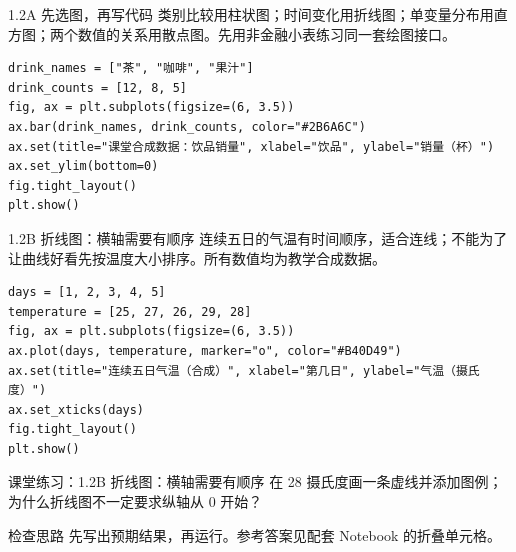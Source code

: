 \begin{frame}[fragile]{1.2A 先选图，再写代码}
\small 类别比较用柱状图；时间变化用折线图；单变量分布用直方图；两个数值的关系用散点图。先用非金融小表练习同一套绘图接口。
\medskip
\begin{lstlisting}
drink_names = ["茶", "咖啡", "果汁"]
drink_counts = [12, 8, 5]
fig, ax = plt.subplots(figsize=(6, 3.5))
ax.bar(drink_names, drink_counts, color="#2B6A6C")
ax.set(title="课堂合成数据：饮品销量", xlabel="饮品", ylabel="销量（杯）")
ax.set_ylim(bottom=0)
fig.tight_layout()
plt.show()
\end{lstlisting}
\end{frame}

\begin{frame}[fragile]{1.2B 折线图：横轴需要有顺序}
\small 连续五日的气温有时间顺序，适合连线；不能为了让曲线好看先按温度大小排序。所有数值均为教学合成数据。
\medskip
\begin{lstlisting}
days = [1, 2, 3, 4, 5]
temperature = [25, 27, 26, 29, 28]
fig, ax = plt.subplots(figsize=(6, 3.5))
ax.plot(days, temperature, marker="o", color="#B40D49")
ax.set(title="连续五日气温（合成）", xlabel="第几日", ylabel="气温（摄氏度）")
ax.set_xticks(days)
fig.tight_layout()
plt.show()
\end{lstlisting}
\end{frame}
\begin{frame}[fragile]{课堂练习：1.2B 折线图：横轴需要有顺序}
在 28 摄氏度画一条虚线并添加图例；为什么折线图不一定要求纵轴从 0 开始？
\medskip
\begin{block}{检查思路}
先写出预期结果，再运行。参考答案见配套 Notebook 的折叠单元格。
\end{block}
\end{frame}

